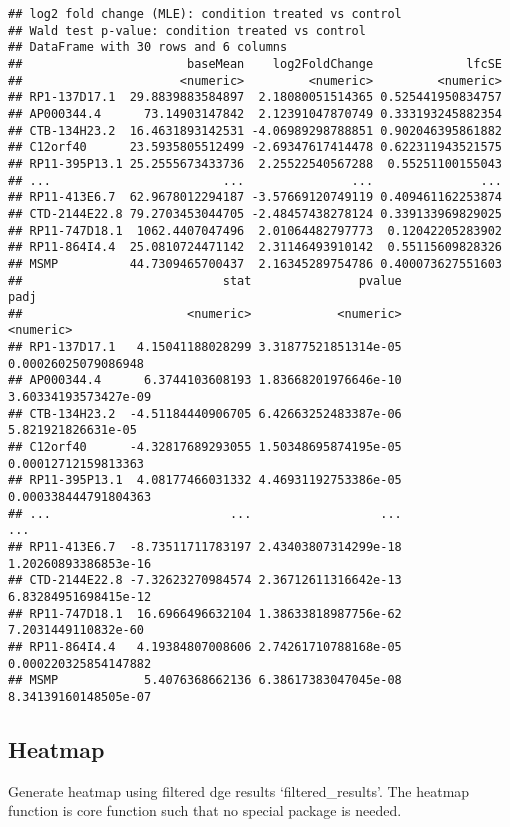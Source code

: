 \documentclass[]{article}
\begin{document}
\begin{verbatim}
## log2 fold change (MLE): condition treated vs control 
## Wald test p-value: condition treated vs control 
## DataFrame with 30 rows and 6 columns
##                       baseMean    log2FoldChange             lfcSE
##                      <numeric>         <numeric>         <numeric>
## RP1-137D17.1  29.8839883584897  2.18080051514365 0.525441950834757
## AP000344.4      73.14903147842  2.12391047870749 0.333193245882354
## CTB-134H23.2  16.4631893142531 -4.06989298788851 0.902046395861882
## C12orf40      23.5935805512499 -2.69347617414478 0.622311943521575
## RP11-395P13.1 25.2555673433736  2.25522540567288  0.55251100155043
## ...                        ...               ...               ...
## RP11-413E6.7  62.9678012294187 -3.57669120749119 0.409461162253874
## CTD-2144E22.8 79.2703453044705 -2.48457438278124 0.339133969829025
## RP11-747D18.1  1062.4407047496  2.01064482797773  0.12042205283902
## RP11-864I4.4  25.0810724471142  2.31146493910142  0.55115609828326
## MSMP          44.7309465700437  2.16345289754786 0.400073627551603
##                            stat               pvalue                 padj
##                       <numeric>            <numeric>            <numeric>
## RP1-137D17.1   4.15041188028299 3.31877521851314e-05  0.00026025079086948
## AP000344.4      6.3744103608193 1.83668201976646e-10 3.60334193573427e-09
## CTB-134H23.2  -4.51184440906705 6.42663252483387e-06   5.821921826631e-05
## C12orf40      -4.32817689293055 1.50348695874195e-05  0.00012712159813363
## RP11-395P13.1  4.08177466031332 4.46931192753386e-05 0.000338444791804363
## ...                         ...                  ...                  ...
## RP11-413E6.7  -8.73511711783197 2.43403807314299e-18 1.20260893386853e-16
## CTD-2144E22.8 -7.32623270984574 2.36712611316642e-13 6.83284951698415e-12
## RP11-747D18.1  16.6966496632104 1.38633818987756e-62  7.2031449110832e-60
## RP11-864I4.4   4.19384807008606 2.74261710788168e-05 0.000220325854147882
## MSMP            5.4076368662136 6.38617383047045e-08 8.34139160148505e-07
\end{verbatim}

\subsection{Heatmap}\label{heatmap}

Generate heatmap using filtered dge results `filtered\_results'. The
heatmap function is core function such that no special package is
needed.
\end{document}
